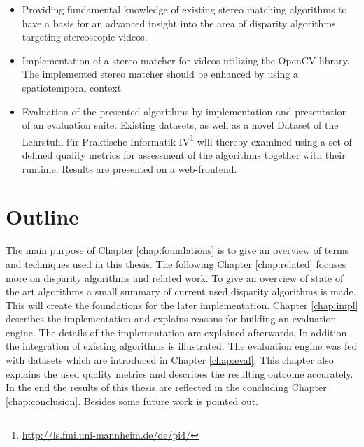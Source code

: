 \begin{itemize}
  \item Providing fundamental knowledge of existing stereo matching algorithms to have a basis for an advanced insight into the area of disparity algorithms targeting stereoscopic videos.
  \item Implementation of a stereo matcher for videos utilizing the OpenCV library. The implemented stereo matcher should be enhanced by using a spatiotemporal context
  \item Evaluation of the presented algorithms by implementation and presentation of an evaluation suite. Existing datasets, as well as a novel Dataset of the Lehrstuhl f{\"u}r Praktische Informatik IV\footnote{\url{http://ls.fmi.uni-mannheim.de/de/pi4/}} will thereby examined using a set of defined quality metrics for assessment of the algorithms together with their runtime. Results are presented on a web-frontend.
\end{itemize}

\section{Outline}

The main purpose of Chapter \ref{chap:foundations} is to give an overview of terms and techniques used in this thesis.
The following Chapter \ref{chap:related} focuses more on disparity algorithms and related work.
To give an overview of state of the art algorithms a small summary of current used disparity algorithms is made.
This will create the foundations for the later implementation.
Chapter \ref{chap:impl} describes the implementation and explains reasons for building an evaluation engine.
The details of the implementation are explained afterwards.
In addition the integration of existing algorithms is illustrated.
The evaluation engine was fed with datasets which are introduced in Chapter \ref{chap:eval}.
This chapter also explains the used quality metrics and describes the resulting outcome accurately.
In the end the results of this thesis are reflected in the concluding Chapter \ref{chap:conclusion}.
Besides some future work is pointed out.
